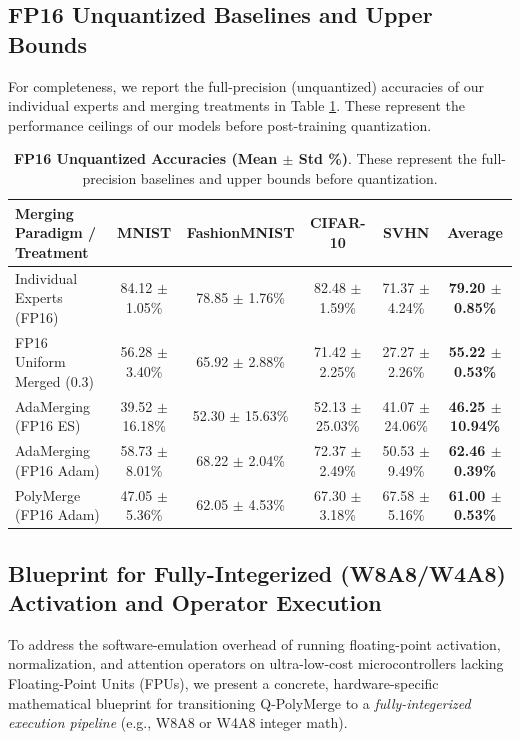 \subsection{FP16 Unquantized Baselines and Upper Bounds}
\label{sec:appendix_unquantized_results}
For completeness, we report the full-precision (unquantized) accuracies of our individual experts and merging treatments in Table \ref{tab:unquantized_results}. These represent the performance ceilings of our models before post-training quantization.

\begin{table}[h]
\centering
\caption{\textbf{FP16 Unquantized Accuracies (Mean $\pm$ Std \%)}. These represent the full-precision baselines and upper bounds before quantization.}
\label{tab:unquantized_results}
\vskip 0.15in
\begin{small}
\begin{sc}
\begin{tabular}{lccccc}
\toprule
Merging Paradigm / Treatment & MNIST & FashionMNIST & CIFAR-10 & SVHN & Average \\
\midrule
Individual Experts (FP16) & 84.12 $\pm$ 1.05\% & 78.85 $\pm$ 1.76\% & 82.48 $\pm$ 1.59\% & 71.37 $\pm$ 4.24\% & \textbf{79.20 $\pm$ 0.85\%} \\
FP16 Uniform Merged (0.3) & 56.28 $\pm$ 3.40\% & 65.92 $\pm$ 2.88\% & 71.42 $\pm$ 2.25\% & 27.27 $\pm$ 2.26\% & \textbf{55.22 $\pm$ 0.53\%} \\
AdaMerging (FP16 ES) & 39.52 $\pm$ 16.18\% & 52.30 $\pm$ 15.63\% & 52.13 $\pm$ 25.03\% & 41.07 $\pm$ 24.06\% & \textbf{46.25 $\pm$ 10.94\%} \\
AdaMerging (FP16 Adam) & 58.73 $\pm$ 8.01\% & 68.22 $\pm$ 2.04\% & 72.37 $\pm$ 2.49\% & 50.53 $\pm$ 9.49\% & \textbf{62.46 $\pm$ 0.39\%} \\
PolyMerge (FP16 Adam) & 47.05 $\pm$ 5.36\% & 62.05 $\pm$ 4.53\% & 67.30 $\pm$ 3.18\% & 67.58 $\pm$ 5.16\% & \textbf{61.00 $\pm$ 0.53\%} \\
\bottomrule
\end{tabular}
\end{sc}
\end{small}
\end{table}

\subsection{Blueprint for Fully-Integerized (W8A8/W4A8) Activation and Operator Execution}
\label{sec:appendix_fully_integerized}
To address the software-emulation overhead of running floating-point activation, normalization, and attention operators on ultra-low-cost microcontrollers lacking Floating-Point Units (FPUs), we present a concrete, hardware-specific mathematical blueprint for transitioning Q-PolyMerge to a \emph{fully-integerized execution pipeline} (e.g., W8A8 or W4A8 integer math).

